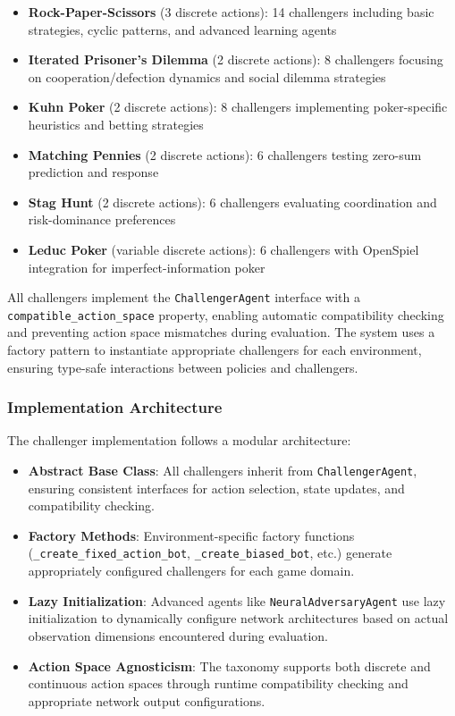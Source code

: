 \documentclass[sigconf,anonymous]{aamas}
\begin{document}
\begin{itemize}
    \item \textbf{Rock-Paper-Scissors} (3 discrete actions): 14 challengers including basic strategies, cyclic patterns, and advanced learning agents
    \item \textbf{Iterated Prisoner's Dilemma} (2 discrete actions): 8 challengers focusing on cooperation/defection dynamics and social dilemma strategies
    \item \textbf{Kuhn Poker} (2 discrete actions): 8 challengers implementing poker-specific heuristics and betting strategies
    \item \textbf{Matching Pennies} (2 discrete actions): 6 challengers testing zero-sum prediction and response
    \item \textbf{Stag Hunt} (2 discrete actions): 6 challengers evaluating coordination and risk-dominance preferences
    \item \textbf{Leduc Poker} (variable discrete actions): 6 challengers with OpenSpiel integration for imperfect-information poker
\end{itemize}

All challengers implement the \texttt{ChallengerAgent} interface with a \texttt{compatible\_action\_space} property, enabling automatic compatibility checking and preventing action space mismatches during evaluation. The system uses a factory pattern to instantiate appropriate challengers for each environment, ensuring type-safe interactions between policies and challengers.

\subsubsection{Implementation Architecture}

The challenger implementation follows a modular architecture:

\begin{itemize}
    \item \textbf{Abstract Base Class}: All challengers inherit from \texttt{ChallengerAgent}, ensuring consistent interfaces for action selection, state updates, and compatibility checking.
    
    \item \textbf{Factory Methods}: Environment-specific factory functions (\texttt{\_create\_fixed\_action\_bot}, \texttt{\_create\_biased\_bot}, etc.) generate appropriately configured challengers for each game domain.
    
    \item \textbf{Lazy Initialization}: Advanced agents like \texttt{NeuralAdversaryAgent} use lazy initialization to dynamically configure network architectures based on actual observation dimensions encountered during evaluation.
    
    \item \textbf{Action Space Agnosticism}: The taxonomy supports both discrete and continuous action spaces through runtime compatibility checking and appropriate network output configurations.
\end{itemize}
\end{document}

